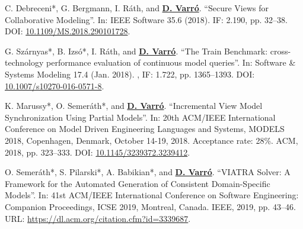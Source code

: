\begin{yearlist}
\item[\cite{ieeesw2018}]
C. Debreceni*, G. Bergmann, I. Ráth, and \underline{\textbf{D. Varró}}. “Secure Views for Collaborative Modeling”. In: IEEE Software 35.6 (2018). IF: 2.190, pp. 32–38. 
\newline DOI: \href{https://doi.org/10.1109/MS.2018.290101728}{10.1109/MS.2018.290101728}.

\item[\cite{sosym2017-tb}]
G. Szárnyas*, B. Izsó*, I. Ráth, and \underline{\textbf{D. Varró}}. “The Train Benchmark: cross-technology performance evaluation of continuous model queries”. In: Software \& Systems Modeling 17.4 (Jan. 2018). , IF: 1.722, pp. 1365–1393. 
\newline DOI: \href{https://doi.org/10.1007/s10270-016-0571-8}{10.1007/s10270-016-0571-8}.

\item[\cite{models2018}]
K. Marussy*, O. Semeráth*, and \underline{\textbf{D. Varró}}. “Incremental View Model Synchronization Using Partial Models”. In: 20th ACM/IEEE International Conference on Model Driven Engineering Languages and Systems, MODELS 2018, Copenhagen, Denmark, October 14-19, 2018. Acceptance rate: 28\%. ACM, 2018, pp. 323--333. 
\newline DOI: \href{https://doi.org/10.1145/3239372.3239412}{10.1145/3239372.3239412}.

\item[\cite{icse2019-tool}]
O. Semeráth*, S. Pilarski*, A. Babikian*, and \underline{\textbf{D. Varró}}. “VIATRA Solver: A Framework for the Automated
Generation of Consistent Domain-Specific Models”. In: 41st ACM/IEEE International Conference on Software
Engineering: Companion Proceedings, ICSE 2019, Montreal, Canada. IEEE, 2019, pp. 43–46. 
\newline URL: \url{https://dl.acm.org/citation.cfm?id=3339687}.




\end{yearlist}
